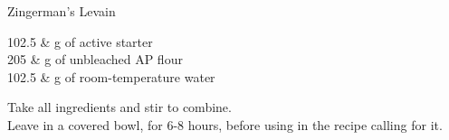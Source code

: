 \setHeadlines
{
}

\begin{recipe}
[ %
    source = Zingerman's via Jim,
]
{Zingerman's Levain}

    \ingredients
    {
		102.5 & g of active starter \\
		205 & g of unbleached AP flour \\
		102.5 & g of room-temperature water \\
    }
    
    \preparation
    {
        \step Take all ingredients and stir to combine. \\
		\step Leave in a covered bowl, for 6-8 hours, before using in the recipe calling for it. 
    }

\end{recipe}
